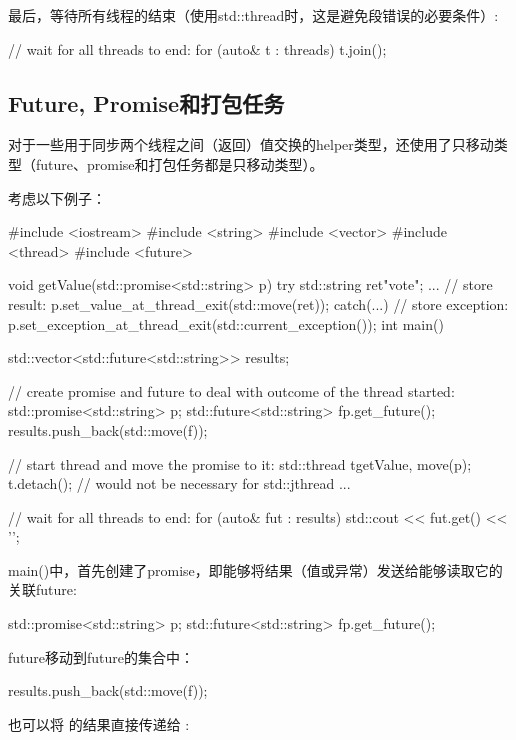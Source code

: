 最后，等待所有线程的结束（使用std::thread时，这是避免段错误的必要条件）:

\begin{cppcode}
// wait for all threads to end:
for (auto& t : threads) {
	t.join();
}
\end{cppcode}

\subsection{Future, Promise和打包任务}

对于一些用于同步两个线程之间（返回）值交换的helper类型，还使用了只移动类型（future、promise和打包任务都是只移动类型）。

考虑以下例子：

\begin{cppcode}
#include <iostream>
#include <string>
#include <vector>
#include <thread>
#include <future>

void getValue(std::promise<std::string> p)
{
	try {
		std::string ret{"vote"};
		...
		// store result:
		p.set_value_at_thread_exit(std::move(ret));
	}
	catch(...) {
		// store exception:
		p.set_exception_at_thread_exit(std::current_exception());
	}
}
int main()
{
	std::vector<std::future<std::string>> results;

	// create promise and future to deal with outcome of the thread started:
	std::promise<std::string> p;
	std::future<std::string> f{p.get_future()};
	results.push_back(std::move(f));

	// start thread and move the promise to it:
	std::thread t{getValue, move(p)};
	t.detach(); // would not be necessary for std::jthread
	...

	// wait for all threads to end:
	for (auto& fut : results) {
		std::cout << fut.get() << '\n';
	}
}
\end{cppcode}

main()中，首先创建了promise，即能够将结果（值或异常）发送给能够读取它的关联future:

\begin{cppcode}
std::promise<std::string> p;
std::future<std::string> f{p.get_future()};
\end{cppcode}

future移动到future的集合中：

\begin{cppcode}
results.push_back(std::move(f));
\end{cppcode}

也可以将  的结果直接传递给 :

